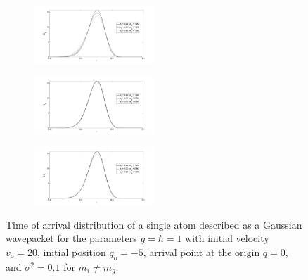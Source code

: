 \documentclass[%
 reprint,
 amsmath,amssymb,
 aps,
]{revtex4-1}
\begin{document}
\begin{figure}[t!]
\begin{subfigure}
\centering
\includegraphics[width=0.5\textwidth]{toadist_mi_less_mg_overlay}
\label{fig:dist_milemg}
\end{subfigure}
\begin{subfigure}
\centering
\includegraphics[width=0.5\textwidth]{toadist_mi_great_mg_overlay}
\label{fig:dist_migrmg}
\end{subfigure}
\begin{subfigure}
\centering
\includegraphics[width=0.5\textwidth]{toadist_mi_nequal_mg_overlay}
\label{fig:dist_minemg}
\end{subfigure}
\caption{Time of arrival distribution of a single atom described as a Gaussian wavepacket for the parameters $g=\hbar=1$ with initial velocity $v_o=20$, initial position $q_o=-5$, arrival point at the origin $q=0$,  and $\sigma^2=0.1$ for $m_i \neq m_g$.}
\label{fig:toadist_overlay}
\end{figure} 
\end{document}
